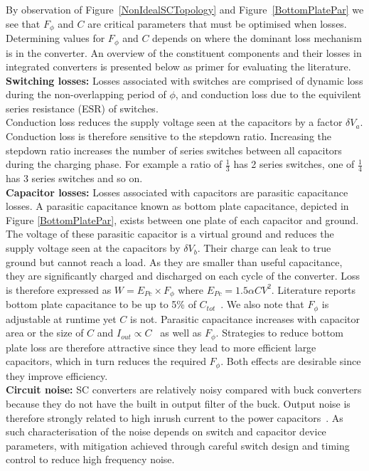 \documentclass[letterpaper,twocolumn,10pt]{article}
\begin{document}
By observation of Figure~\ref{NonIdealSCTopology} and Figure~\ref{BottomPlatePar} we see that $F_\phi$ and $C$ are critical parameters that must be optimised when losses.\\
Determining values for $F_\phi$ and $C$ depends on where the dominant loss mechanism is in the converter. An overview of the constituent components and their losses in integrated converters is presented below as primer for evaluating the literature.\\ 
\textbf{Switching losses: }Losses associated with switches are comprised of dynamic loss during the non-overlapping period of $\phi$, and conduction loss due to the equivilent series resistance (ESR) of switches.\\
Conduction loss reduces the supply voltage seen at the capacitors by a factor $\delta V_a$. Conduction loss is therefore sensitive to the stepdown ratio. Increasing the stepdown ratio increases the number of series switches between all capacitors during the charging phase. For example a ratio of $\frac{1}{3}$ has 2 series switches, one of $\frac{1}{4}$ has 3 series switches and so on.\\
\textbf{Capacitor losses: }Losses associated with capacitors are parasitic capacitance losses. A parasitic capacitance known as bottom plate capacitance, depicted in Figure \ref{BottomPlatePar}, exists between one plate of each capacitor and ground. The voltage of these parasitic capacitor is a virtual ground and reduces the supply voltage seen at the capacitors by $\delta V_b$. Their charge can leak to true ground but cannot reach a load. As they are smaller than useful capacitance, they are significantly charged and discharged on each cycle of the converter. Loss is therefore expressed as $W = E_{Pc} \times F_\phi$ where $E_{Pc} = 1.5\alpha CV^2$. Literature reports bottom plate capacitance to be up to 5\% of $C_{tot}$~\cite{Ramadass2007}. We also note that $F_\phi$ is adjustable at runtime yet $C$ is not. Parasitic capacitance increases with capacitor area or the size of $C$ and $I_{out} \propto C$~\cite{Damak2013} as well as $F_\phi$. Strategies to reduce bottom plate loss are therefore attractive since they lead to more efficient large capacitors, which in turn reduces the required $F_\phi$. Both effects are desirable since they improve efficiency.\\
\textbf{Circuit noise: }SC converters are relatively noisy compared with buck converters because they do not have the built in output filter of the buck. Output noise is therefore strongly related to %
high inrush current to the power capacitors~\cite{Zheng2013}. As such characterisation of the noise depends on switch and capacitor device parameters, with mitigation achieved through careful switch design and timing control to reduce high frequency noise. 
\end{document}
